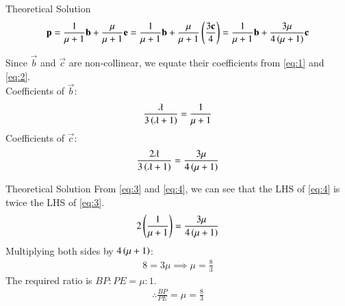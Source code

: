 \documentclass{beamer}
\begin{document}
	\begin{frame}{Theoretical Solution}
		\begin{align}
			\mathbf{p} = \frac{1}{\mu+1}\mathbf{b} + \frac{\mu}{\mu+1} \mathbf{e} = \frac{1}{\mu+1}\mathbf{b} + \frac{\mu}{\mu+1} \left( \frac{3\mathbf{c}}{4} \right) = \frac{1}{\mu+1}\mathbf{b} + \frac{3\mu}{4\left(\mu+1\right)}\mathbf{c} \label{eq:2}
		\end{align}
		
		Since $\vec{b}$ and $\vec{c}$ are non-collinear, we equate their coefficients from \eqref{eq:1} and \eqref{eq:2}.\\
		Coefficients of $\vec{b}$:
		\begin{align}
			\frac{\lambda}{3\left(\lambda+1\right)} = \frac{1}{\mu+1} \label{eq:3}
		\end{align}
		Coefficients of $\vec{c}$:
		\begin{align}
			\frac{2\lambda}{3\left(\lambda+1\right)} = \frac{3\mu}{4\left(\mu+1\right)} \label{eq:4}
		\end{align}
	\end{frame}
	\begin{frame}{Theoretical Solution}
		From \eqref{eq:3} and \eqref{eq:4}, we can see that the LHS of \eqref{eq:4} is twice the LHS of \eqref{eq:3}.
		\begin{align}
			2 \left(\frac{1}{\mu+1}\right) = \frac{3\mu}{4\left(\mu+1\right)}
		\end{align}
		Multiplying both sides by $4\left(\mu+1\right)$:
		\begin{align}
			8 = 3\mu \implies \mu = \frac{8}{3}
		\end{align}
		The required ratio is $BP:PE = \mu:1$.
		\begin{align}
			\therefore	\frac{BP}{PE} = \mu = \frac{8}{3}
		\end{align}
	\end{frame}
	
\end{document}
